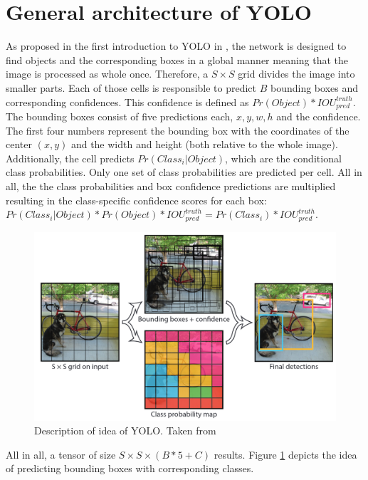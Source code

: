 \section{General architecture of YOLO}
As proposed in the first introduction to YOLO in \cite{yolov1}, the network is designed to find objects and the corresponding boxes in a global manner meaning that the image is processed as whole once. Therefore, a $ S \times S $ grid divides the image into smaller parts. Each of those cells is responsible to predict $ B $ bounding boxes and corresponding confidences. This confidence is defined as $ Pr(Object) * IOU_{pred}^{truth} $. The bounding boxes consist of five predictions each, $ x, y, w, h $ and the confidence. The first four numbers represent the bounding box with the coordinates of the center $ (x,y) $ and the width and height (both relative to the whole image). Additionally, the cell predicts $ Pr(Class_i|Object) $, which are the conditional class probabilities. Only one set of class probabilities are predicted per cell. All in all, the the class probabilities and box confidence predictions are multiplied resulting in the class-specific confidence scores for each box: $ Pr(Class_i|Object) * Pr(Object) * IOU_{pred}^{truth} = Pr(Class_i) * IOU_{pred}^{truth} $.
 
\begin{figure}[htb!]
	\centering
	\includegraphics[scale=0.25]{figures/YOLO_functionality.png}
	\caption{Description of idea of YOLO. Taken from \cite{yolov1}}
	\label{fig:YOLO_idea}
\end{figure}

All in all, a tensor of size $ S \times S \times (B * 5 + C) $ results. Figure \ref{fig:YOLO_idea} depicts the idea of predicting bounding boxes with corresponding classes. \\

